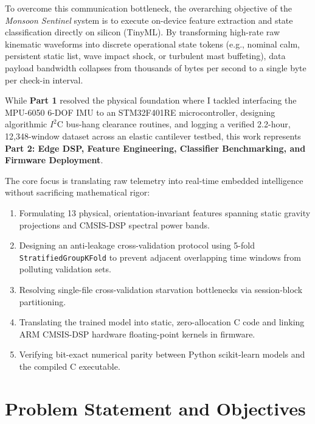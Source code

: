 \documentclass[twocolumn]{article}
\begin{document}
To overcome this communication bottleneck, the overarching objective of the \textit{Monsoon Sentinel} system is to execute on-device feature extraction and state classification directly on silicon (TinyML). By transforming high-rate raw kinematic waveforms into discrete operational state tokens (e.g., nominal calm, persistent static list, wave impact shock, or turbulent mast buffeting), data payload bandwidth collapses from thousands of bytes per second to a single byte per check-in interval.

While \textbf{Part 1} resolved the physical foundation where I tackled interfacing the MPU-6050 6-DOF IMU to an STM32F401RE microcontroller, designing algorithmic $I^2\text{C}$ bus-hang clearance routines, and logging a verified 2.2-hour, 12,348-window dataset across an elastic cantilever testbed, this work represents \textbf{Part 2: Edge DSP, Feature Engineering, Classifier Benchmarking, and Firmware Deployment}.

The core focus is translating raw telemetry into real-time embedded intelligence without sacrificing mathematical rigor:
\begin{enumerate}[noitemsep]
    \item Formulating 13 physical, orientation-invariant features spanning static gravity projections and CMSIS-DSP spectral power bands.
    \item Designing an anti-leakage cross-validation protocol using 5-fold \texttt{StratifiedGroupKFold} to prevent adjacent overlapping time windows from polluting validation sets.
    \item Resolving single-file cross-validation starvation bottlenecks via session-block partitioning.
    \item Translating the trained model into static, zero-allocation C code and linking ARM CMSIS-DSP hardware floating-point kernels in firmware.
    \item Verifying bit-exact numerical parity between Python scikit-learn models and the compiled C executable.
\end{enumerate}


\section{Problem Statement and Objectives}
\end{document}
